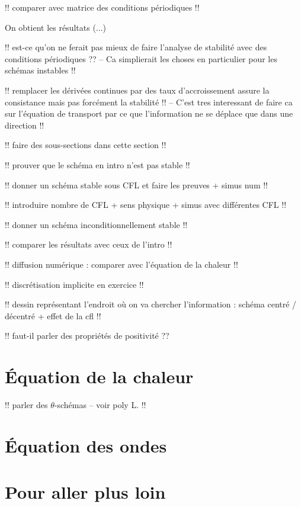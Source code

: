 \documentclass[12pt,a4paper,twoside]{article}
\begin{document}
!! comparer avec matrice des conditions p\'eriodiques !!


On obtient les r\'esultats (...)

!! est-ce qu'on ne ferait pas mieux de faire l'analyse de stabilit\'e
avec des conditions p\'eriodiques ??
-- Ca simplierait les choses en particulier pour les sch\'emas instables !!


!! remplacer les d\'eriv\'ees continues par des taux d'accroissement
assure la consistance mais pas forc\'ement la stabilit\'e !!
-- C'est tres interessant de faire ca sur l'\'equation de transport par ce que 
l'information ne se d\'eplace que dans une direction !!

!! faire des sous-sections dans cette section !!

!! prouver que le sch\'ema en intro n'est pas stable !!

!! donner un sch\'ema stable sous CFL et faire les preuves + simus num !!

!! introduire nombre de CFL + sens physique + simus avec diff\'erentes CFL !!

!! donner un sch\'ema inconditionnellement stable !!

!! comparer les r\'esultats avec ceux de l'intro !!

!! diffusion num\'erique : comparer avec l'\'equation de la chaleur !!

!! discr\'etisation implicite en exercice !!

!! dessin repr\'esentant l'endroit o\`u on va chercher l'information :
sch\'ema centr\'e / d\'ecentr\'e + effet de la cfl !!

!! faut-il parler des propri\'et\'es de positivit\'e ??

\section{\'Equation de la chaleur}

!! parler des $\theta$-sch\'emas -- voir poly L. !!

\section{\'Equation des ondes}


\section{Pour aller plus loin}
\end{document}
